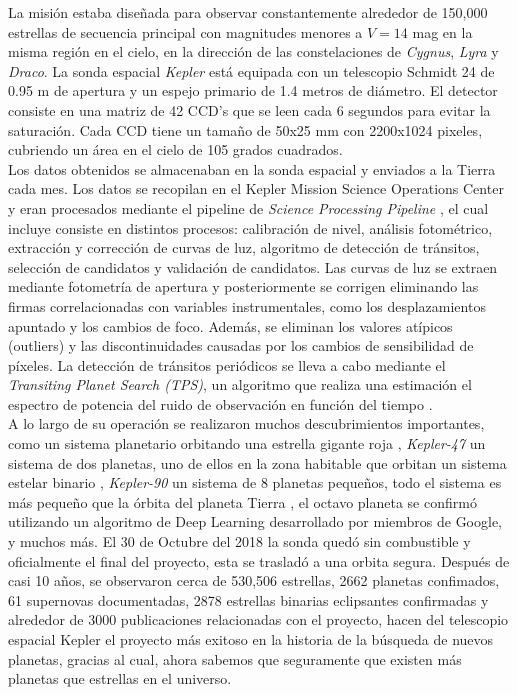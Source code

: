 La misión estaba diseñada para observar constantemente alrededor de 150,000 estrellas de secuencia principal con magnitudes menores a $V=14$ mag en la misma región en el cielo, en la dirección de las constelaciones de \textit{Cygnus}, \textit{Lyra} y \textit{Draco}. La sonda espacial \textit{Kepler} está equipada con un telescopio Schmidt 24 de 0.95 m de apertura y un espejo primario de 1.4 metros de diámetro. El detector consiste en una matriz de 42 CCD’s que se leen cada 6 segundos para evitar la saturación. Cada CCD tiene un tamaño de 50x25 mm con 2200x1024 pixeles, cubriendo un área en el cielo de 105 grados cuadrados.\\

Los datos obtenidos se almacenaban en la sonda espacial y enviados a la Tierra cada mes. Los datos se recopilan en el Kepler Mission Science Operations Center y eran procesados mediante el pipeline de \textit{Science Processing Pipeline} \cite{jenkins2010overview}, el cual incluye consiste en distintos procesos: calibración de nivel, análisis fotométrico, extracción y corrección de curvas de luz, algoritmo de detección de tránsitos, selección de candidatos y validación de candidatos. Las curvas de luz se extraen mediante fotometría de apertura y posteriormente se corrigen eliminando las firmas correlacionadas con variables instrumentales, como los desplazamientos apuntado y los cambios de foco.
Además, se eliminan los valores atípicos (outliers) y las discontinuidades causadas por los cambios de sensibilidad de píxeles. La detección de tránsitos periódicos se lleva a cabo mediante el \textit{Transiting Planet Search (TPS)}, un algoritmo que realiza una estimación el espectro de potencia del ruido de observación en función del tiempo \cite{jenkins2010transiting}.\\

A lo largo de su operación se realizaron muchos descubrimientos importantes, como un sistema planetario orbitando una estrella gigante roja \cite{charpinet2011compact}, \textit{Kepler-47} un sistema de dos planetas, uno de ellos en la zona habitable que orbitan un sistema estelar binario \cite{orosz2012kepler}, \textit{Kepler-90} un sistema de 8 planetas pequeños, todo el sistema es más pequeño que la órbita del planeta Tierra \cite{shallue2018identifying}, el octavo planeta se confirmó utilizando un algoritmo de Deep Learning desarrollado por miembros de Google, y muchos más. El 30 de Octubre del 2018 la sonda quedó sin combustible y oficialmente el final del proyecto, esta se trasladó a una orbita segura. Después de casi 10 años, se observaron cerca de 530,506 estrellas, 2662 planetas confimados, 61 supernovas documentadas, 2878 estrellas binarias eclipsantes confirmadas y alrededor de 3000 publicaciones relacionadas con el proyecto, hacen del telescopio espacial Kepler el proyecto más exitoso en la historia de la búsqueda de nuevos planetas, gracias al cual, ahora sabemos que seguramente que existen más planetas que estrellas en el universo.\\

